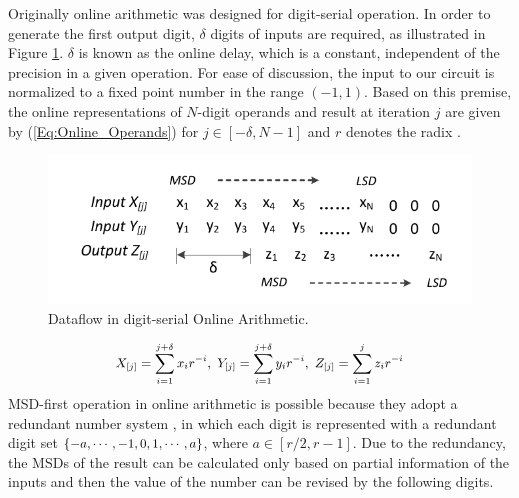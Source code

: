 \documentclass{acm_proc_article-sp}
\begin{document}
Originally online arithmetic was designed for digit-serial operation. In order to generate the first output digit, $\delta$ digits of inputs are required, as illustrated in Figure \ref{Fig:OnlineDataFlow}. $\delta$ is known as the online delay, which is a constant, independent of the precision in a given operation. For ease of discussion, the input to our circuit is normalized to a fixed point number in the range $(-1,1)$. Based on this premise, the online representations of $N$-digit operands and result at iteration $j$ are given by (\ref{Eq:Online_Operands}) for $j\in[-\delta,N-1]$ and $r$ denotes the radix \cite{Ercegovac_Book}.\vspace{-1ex}
%
\begin{figure}[htbp]
  \centering
  \vspace{-2.5ex}
  \includegraphics[width=.44\textwidth]{./Figures/OnlineArithmetic_DataFlow.pdf}
  \vspace{-3ex}
  \caption{Dataflow in digit-serial Online Arithmetic.}
  \vspace{-.5ex}
  \label{Fig:OnlineDataFlow}
\end{figure}
%
\begin{eqnarray}\label{Eq:Online_Operands}
\footnotesize
  X_{[j]}=\sum_{i=1}^{j+\delta}x_ir^{-i},~Y_{[j]}=\sum_{i=1}^{j+\delta}y_ir^{-i},~Z_{[j]}=\sum_{i=1}^{j}z_ir^{-i}
\normalsize
\end{eqnarray}
%
MSD-first operation in online arithmetic is possible because they adopt a redundant number system \cite{RedundantNumber}, in which each digit is represented with a redundant digit set $\{-a, \cdots,-1,\\0, 1, \cdots, a\}$, where $a\in[r/2,r-1]$. Due to the redundancy, the MSDs of the result can be calculated only based on partial information of the inputs and then the value of the number can be revised by the following digits.
\end{document}
